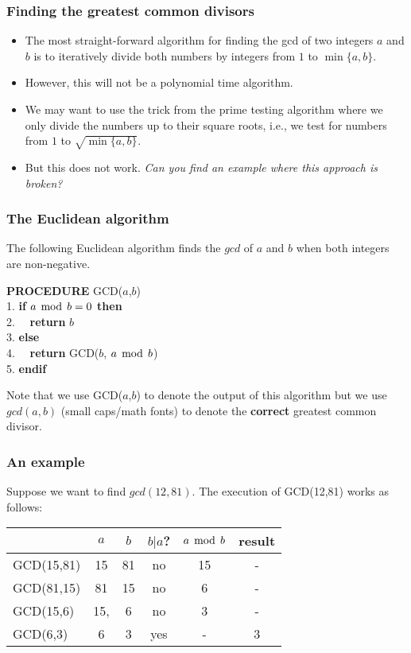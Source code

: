 \begin{frame}\frametitle{Finding the greatest common divisors}
  \begin{itemize}
  \item The most straight-forward algorithm for finding the gcd of two
    integers $a$ and $b$ is to iteratively divide both numbers by
    integers from $1$ to $\min\{a,b\}$.
  \item However, this will not be a polynomial time algorithm.
  \item We may want to use the trick from the prime testing algorithm
    where we only divide the numbers up to their square roots, i.e.,
    we test for numbers from $1$ to $\sqrt{\min\{a,b\}}$.
  \item But this does not work. {\em Can you find an example where this
    approach is broken?}
  \end{itemize}
\end{frame}

\begin{frame}\frametitle{The Euclidean algorithm}
  The following Euclidean algorithm finds the $gcd$ of $a$ and $b$ when
  both integers are non-negative.

  \vspace{0.1in}
  \begin{tcolorbox}[title=The Euclidean algorithm]
    {\bf PROCEDURE} GCD($a$,$b$)\\
    1. {\bf if} $a\,\bmod\, b=0$ {\bf then} \\
    2. \ \ {\bf return} $b$ \\
    3. {\bf else} \\
    4. \ \ {\bf return} GCD($b$, $a\,\bmod\, b$)\\
    5. {\bf endif}
  \end{tcolorbox}

  \vspace{0.2in} Note that we use GCD($a$,$b$) to denote the output of
  this algorithm but we use $gcd(a,b)$ (small caps/math fonts) to
  denote the {\bf correct} greatest common divisor.
\end{frame}

\begin{frame}\frametitle{An example}
  Suppose we want to find $gcd(12,81)$.  The execution of GCD(12,81)
  works as follows:

  \vspace{0.2in}
  \begin{tabular}{l|c|c|c|c|c}
    & $a$ & $b$ & $b|a$? & $a\,\bmod\, b$ & result \\
    \hline
    GCD(15,81) & 15 & 81 & no & 15 & - \\
    GCD(81,15) & 81 & 15 & no & 6 & - \\
    GCD(15,6) & 15, & 6 & no & 3 & - \\
    GCD(6,3) & 6 & 3 & yes & - & 3 \\
    \hline
  \end{tabular}
\end{frame}


